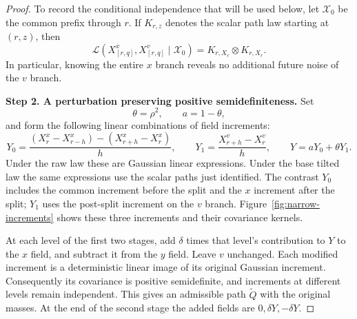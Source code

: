 \begin{proof}
To record the conditional independence that will be used below, let
$\mathcal X_0$ be the common prefix through $r$. If $K_{r,z}$ denotes
the scalar path law starting at $(r,z)$, then
\[
 \mathcal L(X^x_{[r,q]},X^v_{[r,q]}\mid\mathcal X_0)
 =K_{r,X_r}\otimes K_{r,X_r}.
\]
In particular, knowing the entire $x$ branch reveals no additional
future noise of the $v$ branch.

\par\medskip\noindent\textbf{Step 2. A perturbation preserving positive semidefiniteness.}\enspace
Set
\[
 \theta=\rho^2,\qquad a=1-\theta,
\]
and form the following linear combinations of field increments:
\begin{equation}\label{eq:narrow-Y}
 Y_0=\frac{(X^x_r-X^x_{r-h})-(X^x_{r+h}-X^x_r)}h,\qquad
 Y_1=\frac{X^v_{r+h}-X^v_r}h,\qquad
 Y=aY_0+\theta Y_1.
\end{equation}
Under the raw law these are Gaussian linear expressions. Under the
base tilted law the same expressions use the scalar paths just
identified. The contrast $Y_0$ includes the common increment before
the split and the $x$ increment after the split; $Y_1$ uses the
post-split increment on the $v$ branch. Figure~\ref{fig:narrow-increments}
shows these three increments and their covariance kernels.


At each level of the first two stages, add $\delta$ times that
level's contribution to $Y$ to the $x$ field, and subtract it from
the $y$ field. Leave $v$ unchanged. Each modified increment is a
deterministic linear image of its original Gaussian increment.
Consequently its covariance is positive semidefinite, and increments
at different levels remain independent. This gives an admissible
path $\widetilde Q$ with the original masses. At the end of the
second stage the added fields are $0,\delta Y,-\delta Y$.


\end{proof}
